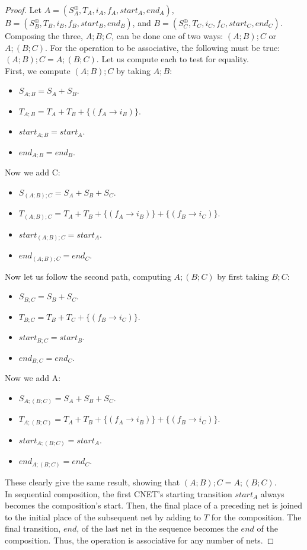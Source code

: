 \begin{proof}
Let $A = (S_A^\oplus, T_A, i_A, f_A, start_A, end_A)$, $B = (S_B^\oplus, T_B, i_B, f_B, start_B, end_B)$, and $B = (S_C^\oplus, T_C, i_C, f_C, start_C, end_C)$. Composing the three, $A;B;C$, can be done one of two ways: $(A;B);C$ or $ A;(B;C)$. For the operation to be associative, the following must be true: $(A;B);C = A;(B;C).$ Let us compute each to test for equality.\\
First, we compute $(A;B);C$ by taking $A;B$:
\begin{itemize}
\item $S_{A;B} = S_A + S_B.$
\item $T_{A;B} = T_A + T_B + \{(f_A \to i_B)\}$.
\item $start_{A;B} = start_A.$
\item $end_{A;B} = end_B. $
\end{itemize} 
Now we add C:
\begin{itemize}
\item $S_{(A;B);C} = S_A + S_B + S_C.$
\item $T_{(A;B);C} = T_A + T_B + \{(f_A \to i_B)\} + \{(f_B \to i_C)\}.$
\item $start_{(A;B);C} = start_A.$
\item $end_{(A;B);C} = end_C. $
\end{itemize}
Now let us follow the second path, computing $A;(B;C)$ by first taking $B;C$:
\begin{itemize}
\item $S_{B;C} = S_B + S_C.$
\item $T_{B;C} = T_B + T_C + \{(f_B \to i_C)\}.$
\item $start_{B;C} = start_B.$
\item $end_{B;C} = end_C.$ 
\end{itemize} 
Now we add A:
\begin{itemize}
\item $S_{A;(B;C)} = S_A + S_B + S_C.$
\item $T_{A;(B;C)} = T_A + T_B + \{(f_A \to i_B)\} + \{(f_B \to i_C)\}.$
\item $start_{A;(B;C)} = start_A.$
\item$ end_{A;(B;C)} = end_C. $
\end{itemize}  
These clearly give the same result, showing that $(A;B);C = A;(B;C).$ \\
In sequential composition, the first CNET's starting transition $start_A$ always becomes the composition's start. Then, the final place of a preceding net is joined to the initial place of the subsequent net by adding to $T$ for the composition. The final transition, $end$, of the last net in the sequence becomes the $end$ of the composition. Thus, the operation is associative for any number of nets.%
\end{proof}
